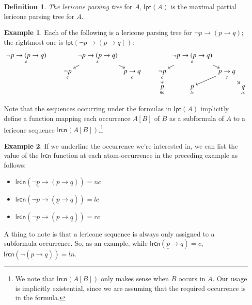 \documentclass{amsart}
\theoremstyle{definition}
\newtheorem{ex}{Example}
\newtheorem{mdef}{Definition}
\newcommand{\lrcn}{\mathsf{lrcn}}
\newcommand{\lpt}{\mathsf{lpt}}
\begin{document}
\begin{mdef}
    \textit{The lericone parsing tree} for $A$, $\lpt(A)$ is the maximal partial lericone parsing tree for $A$. 
\end{mdef}

\begin{ex}
    Each of the following is a lericone parsing tree for $\neg p\to(p\to q)$; the rightmost one is $\lpt(\neg p\to(p\to q))$:
    \begin{displaymath}
        \xymatrix@=1mm{
            \underset{\varepsilon}{\neg p\to(p\to q)}
        }
        \qquad
        \xymatrix@=1mm{
            &   \underset{\varepsilon}{\neg p\to(p\to q)}\ar[dr]\ar[dl]    & \\
            \underset{c}{\neg p} &   &\underset{c}{p\to q}
        }
        \qquad
        \xymatrix@=1mm{
            &   \underset{\varepsilon}{\neg p\to(p\to q)}\ar[dr]\ar[dl]   & &\\
            \underset{c}{\neg p}\ar[d] &   &\underset{c}{p\to q}\ar[dr]\ar[dl] & \\
            \underset{nc}{p} & \underset{lc}{p} & & \underset{rc}{q}
        }
    \end{displaymath}
\end{ex}

Note that the sequences occurring under the formulas in $\lpt(A)$ implicitly define a function mapping each occurrence $A[B]$ of $B$ as a subformula of $A$ to a lericone sequence $\lrcn(A[B])$.\footnote{We note that $\lrcn(A[B])$ only makes sense when $B$ occurs in $A$. Our usage is implicitly existential, since we are assuming that the required occurrence is in the formula. 
}

\begin{ex}
    If we underline the occurrence we're interested in, we can list the value of the $\lrcn$ function at each atom-occurrence in the preceding example as follows:
    \begin{itemize}
        \item $\lrcn(\neg\underline{p}\to(p\to q))=nc$
        \item $\lrcn(\neg p\to(\underline{p}\to q))=lc$
        \item $\lrcn(\neg p\to(p\to\underline{q}))=rc$
    \end{itemize}

    A thing to note is that a lericone sequence is always only assigned to a subformula occurrence. So, as an example, while $\lrcn(\underline{p}\to q)=c$, $\lrcn(\neg(\underline{p}\to q))=ln$.
\end{ex}
\end{document}
